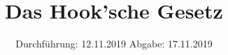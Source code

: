 

\subject{Versuch 803}
\title{Das Hook'sche Gesetz}
\date{%
  Durchführung: 12.11.2019
  \hspace{3em}
  Abgabe: 17.11.2019
}



\maketitle
\thispagestyle{empty}
\tableofcontents
\newpage








\printbibliography{}


